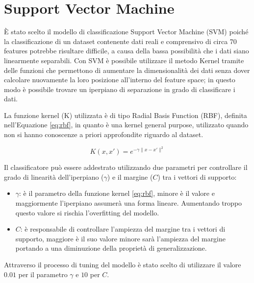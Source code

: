 \section{Support Vector Machine}
È stato scelto il modello di classificazione 
Support Vector Machine (SVM) poiché la classificazione di un dataset contenente 
dati reali e comprensivo di circa 70 features potrebbe risultare difficile, a 
causa della bassa possibilità che i dati siano linearmente separabili. 
Con SVM è possibile utilizzare il metodo Kernel tramite delle funzioni 
che permettono di aumentare la dimensionalità dei dati senza dover 
calcolare nuovamente la loro posizione all'interno del feature space; in questo 
modo è possibile trovare un iperpiano di separazione in grado di classificare 
i dati.

La funzione kernel (K) utilizzata è di tipo Radial Basis Function (RBF), 
definita nell'Equazione \ref{eq:rbf}, in quanto è una kernel general purpose, 
utilizzato quando non si hanno conoscenze a priori approfondite riguardo al 
dataset.

\begin{equation}\label{eq:rbf}
    K(x, x') = e^{- \gamma \|x - x'\|^2}
\end{equation}

Il classificatore può essere addestrato utilizzando due parametri per 
controllare il grado di linearità dell'iperpiano ($\gamma$) e il margine ($C$) 
tra i vettori di supporto:

\begin{itemize}
    \item $\gamma$: è il parametro della funzione kernel \ref{eq:rbf}, minore è 
    il valore e maggiormente l'iperpiano assumerà una forma lineare. 
    Aumentando troppo questo valore si rischia l'overfitting del modello.
    \item $C$: è responsabile di controllare l'ampiezza del margine tra i 
    vettori di supporto, maggiore è il suo valore minore sarà l'ampiezza del 
    margine portando a una diminuzione della proprietà di generalizzazione.
\end{itemize}

Attraverso il processo di tuning del modello è stato scelto di utilizzare il 
valore $0.01$ per il parametro $\gamma$ e $10$ per $C$.
